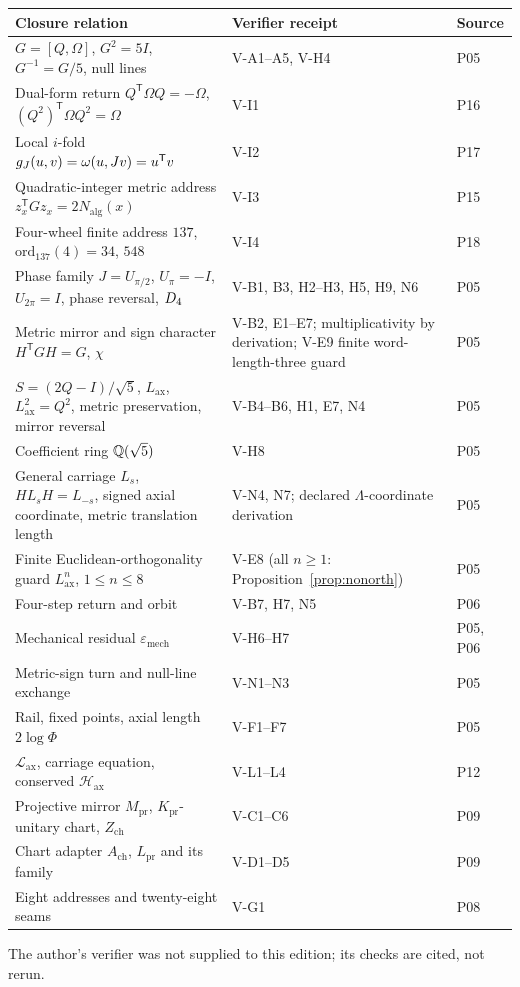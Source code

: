 \documentclass[11pt,a4paper]{article}
\newcommand{\tp}{^{\mathsf T}}
\newcommand{\Lax}{L_{\mathrm{ax}}}\newcommand{\Lpr}{L_{\mathrm{pr}}}
\newcommand{\emech}{\varepsilon_{\mathrm{mech}}}\newcommand{\eHS}{\varepsilon_{\mathrm{HS}}}
\newcommand{\Nalg}{N_{\mathrm{alg}}}\newcommand{\Fac}{\mathrm{Fac}_G}
\newcommand{\Lag}{\mathcal{L}_{\mathrm{ax}}}\newcommand{\Hax}{\mathcal{H}_{\mathrm{ax}}}
\newcommand{\Mpr}{M_{\mathrm{pr}}}\newcommand{\Kpr}{K_{\mathrm{pr}}}\newcommand{\Upr}{U_{\mathrm{pr}}}
\newcommand{\Ach}{A_{\mathrm{ch}}}\newcommand{\Zch}{Z_{\mathrm{ch}}}
\theoremstyle{plain}
\theoremstyle{definition}
\theoremstyle{remark}
\begin{document}
\begin{center}\small\setlength{\tabcolsep}{4pt}
\begin{tabularx}{\linewidth}{@{}>{\raggedright\arraybackslash}p{5.9cm}>{\raggedright\arraybackslash}X>{\raggedright\arraybackslash}p{1.6cm}@{}}
\toprule
Closure relation & Verifier receipt & Source\\\midrule
$G=[Q,\Omega]$, $G^2=5I$, $G^{-1}=G/5$, null lines & V-A1--A5, V-H4 & P05\\
Dual-form return $Q\tp\Omega Q=-\Omega$, $(Q^2)\tp\Omega Q^2=\Omega$ & V-I1 & P16\\
Local $i$-fold $\gJ(u,v)=\omega(u,Jv)=u\tp v$ & V-I2 & P17\\
Quadratic-integer metric address $z_x\tp Gz_x=2\Nalg(x)$ & V-I3 & P15\\
Four-wheel finite address $137$, $\mathrm{ord}_{137}(4)=34$, $548$ & V-I4 & P18\\
Phase family $J=U_{\pi/2}$, $U_\pi=-I$, $U_{2\pi}=I$, phase reversal, $D_4$ & V-B1, B3, H2--H3, H5, H9, N6 & P05\\
Metric mirror and sign character $H\tp GH=G$, $\chi$ & V-B2, E1--E7; multiplicativity by derivation; V-E9 finite word-length-three guard & P05\\
$S=(2Q-I)/\sqrt5$, $\Lax$, $\Lax^2=Q^2$, metric preservation, mirror reversal & V-B4--B6, H1, E7, N4 & P05\\
Coefficient ring $\mathbb{Q}(\sqrt5)$ & V-H8 & P05\\
General carriage $L_s$, $HL_sH=L_{-s}$, signed axial coordinate, metric translation length & V-N4, N7; declared $\Lambda$-coordinate derivation & P05\\
Finite Euclidean-orthogonality guard $\Lax^n$, $1\le n\le8$ & V-E8 (all $n\ge1$: Proposition~\ref{prop:nonorth}) & P05\\
Four-step return and orbit & V-B7, H7, N5 & P06\\
Mechanical residual $\emech$ & V-H6--H7 & P05, P06\\
Metric-sign turn and null-line exchange & V-N1--N3 & P05\\
Rail, fixed points, axial length $2\log\Phi$ & V-F1--F7 & P05\\
$\Lag$, carriage equation, conserved $\Hax$ & V-L1--L4 & P12\\
Projective mirror $\Mpr$, $\Kpr$-unitary chart, $\Zch$ & V-C1--C6 & P09\\
Chart adapter $\Ach$, $\Lpr$ and its family & V-D1--D5 & P09\\
Eight addresses and twenty-eight seams & V-G1 & P08\\\bottomrule
\end{tabularx}
\end{center}
The author's verifier was not supplied to this edition; its checks are cited, not rerun.
\end{document}
